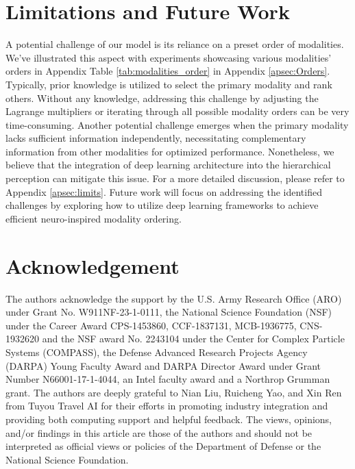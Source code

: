 \documentclass{article} %
\begin{document}

\section{Limitations and Future Work}
A potential challenge of our model is its reliance on a preset order of modalities. We've illustrated this aspect with experiments showcasing various modalities' orders in Appendix Table \ref{tab:modalities_order} in Appendix \ref{apsec:Orders}. Typically, prior knowledge is utilized to select the primary modality and rank others. Without any knowledge, addressing this challenge by adjusting the Lagrange multipliers or iterating through all possible modality orders can be very time-consuming. Another potential challenge emerges when the primary modality lacks sufficient information independently, necessitating complementary information from other modalities for optimized performance. Nonetheless, we believe that the integration of deep learning architecture into the hierarchical perception can mitigate this issue. For a more detailed discussion, please refer to Appendix \ref{apsec:limits}. Future work will focus on addressing the identified challenges by exploring how to utilize deep learning frameworks to achieve efficient neuro-inspired modality ordering.

\clearpage

\section*{Acknowledgement}
The authors acknowledge the support by the U.S. Army Research Office (ARO) under Grant No. W911NF-23-1-0111, the National Science Foundation (NSF) under the Career Award CPS-1453860, CCF-1837131, MCB-1936775, CNS-1932620 and the NSF award No. 2243104 under the Center for Complex Particle Systems (COMPASS), the Defense Advanced Research Projects Agency (DARPA) Young Faculty Award and DARPA Director Award under Grant Number N66001-17-1-4044, an Intel faculty award and a Northrop Grumman grant. The authors are deeply grateful to Nian Liu, Ruicheng Yao, and Xin Ren from Tuyou Travel AI for their efforts in promoting industry integration and providing both computing support and helpful feedback. The views, opinions, and/or findings in this article are those of the authors and should not be interpreted as official views or policies of the Department of Defense or the National Science Foundation. 
\end{document}
